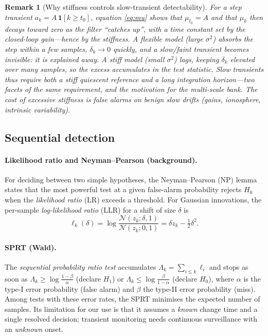 \documentclass[11pt]{article}
\newtheorem{remark}{Remark}
\newcommand{\Norm}{\mathcal{N}}
\newcommand{\half}{\tfrac{1}{2}}
\begin{document}
\begin{remark}[Why stiffness controls slow-transient detectability]
For a step transient $a_k=A\,\mathbf{1}[k\ge t_0]$, equation \eqref{eq:mu} shows that
$\mu_{t_0}=A$ and that $\mu_k$ then decays toward zero as the filter ``catches up'',
with a time constant set by the closed-loop gain---hence by the stiffness. A
\emph{flexible} model (large $\sigma^2$) absorbs the step within a few samples,
$\delta_k\to0$ quickly, and a slow/faint transient becomes invisible: it is
\emph{explained away}. A \emph{stiff} model (small $\sigma^2$) lags, keeping
$\delta_k$ elevated over many samples, so the excess accumulates in the test
statistic. Slow transients thus require both a stiff quiescent reference and a long
integration horizon---two facets of the same requirement, and the motivation for the
multi-scale bank. The cost of excessive stiffness is false alarms on benign slow
drifts (gains, ionosphere, intrinsic variability).
\end{remark}

\subsection{Sequential detection}
\label{sec:seqdet}

\paragraph{Likelihood ratio and Neyman--Pearson (background).}
For deciding between two simple hypotheses, the Neyman--Pearson (NP) lemma states that
the most powerful test at a given false-alarm probability rejects $H_0$ when the
\emph{likelihood ratio} (LR) exceeds a threshold. For Gaussian innovations, the
per-sample \emph{log-likelihood ratio} (LLR) for a shift of size $\delta$ is
\begin{equation}
  \ell_k(\delta) = \log\frac{\Norm(z_k;\delta,1)}{\Norm(z_k;0,1)}
                 = \delta z_k - \half\delta^2 .
  \label{eq:llr}
\end{equation}

\paragraph{SPRT (Wald).}
The \emph{sequential probability ratio test} accumulates $\Lambda_k=\sum_{i\le k}\ell_i$
and stops as soon as $\Lambda_k\ge \log\frac{1-\beta}{\alpha}$ (declare $H_1$) or
$\Lambda_k\le\log\frac{\beta}{1-\alpha}$ (declare $H_0$), where $\alpha$ is the
type-I error probability (false alarm) and $\beta$ the type-II error probability
(miss). Among tests with these error rates, the SPRT minimises the expected number of
samples. Its limitation for our use is that it assumes a \emph{known} change time and
a single resolved decision; transient monitoring needs continuous surveillance with
an \emph{unknown} onset.
\end{document}
